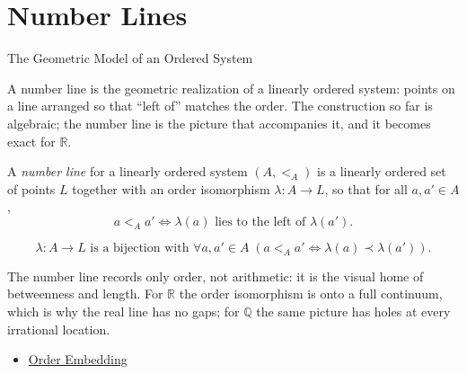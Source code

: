\section{Number Lines}
\label{sec:number-lines}

\begin{topicbox}{The Geometric Model of an Ordered System}
\begin{exposition}
A number line is the geometric realization of a linearly ordered system: points on a line arranged so that ``left of'' matches the order. The construction so far is algebraic; the number line is the picture that accompanies it, and it becomes exact for $\mathbb{R}$.
\end{exposition}
\end{topicbox}
\begin{tcolorbox}[colback=defbox, colframe=defborder, arc=2pt,
  left=6pt, right=6pt, top=4pt, bottom=4pt,
  title={\small\textbf{Definition (Number Line)}},
  fonttitle=\small\bfseries]
\begin{definition}
\label{def:number-line}
A \emph{number line} for a linearly ordered system $(A,<_A)$ is a linearly ordered set of points $L$ together with an order isomorphism $\lambda:A\to L$, so that for all $a,a'\in A$,
\[
a<_A a' \Longleftrightarrow \lambda(a) \text{ lies to the left of } \lambda(a').
\]
\end{definition}
\end{tcolorbox}
\begin{remark*}
\[
\lambda:A\to L \text{ is a bijection with } \forall a,a'\in A\;(a<_A a'\Leftrightarrow \lambda(a)\prec\lambda(a')).
\]
\end{remark*}
\begin{remark*}[Interpretation]
The number line records only order, not arithmetic: it is the visual home of betweenness and length. For $\mathbb{R}$ the order isomorphism is onto a full continuum, which is why the real line has no gaps; for $\mathbb{Q}$ the same picture has holes at every irrational location.
\end{remark*}
\begin{dependencies}
\begin{itemize}
  \item \hyperref[def:order-embedding]{Order Embedding}
\end{itemize}
\end{dependencies}
